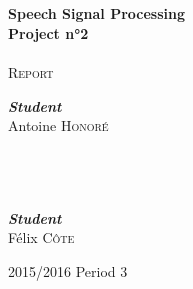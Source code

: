 \begin{titlepage}
  \begin{sffamily}
    \begin{center}

      \textsc{ }\\[1.5cm]

      \HRule \\[0.4cm]
      { \Huge \bfseries Speech Signal Processing\\ Project n°2\\[0.4cm] }
      \HRule \\[2.5cm]
      \textsc{\LARGE Report}~\\[2.5cm]
      \begin{minipage}{0.4\textwidth}
        \begin{flushleft} \large
          \emph{\textbf{Student}}\\
          Antoine \textsc{Honoré}\\
          ~\\~\\~\\
        \end{flushleft}
      \end{minipage}
      \hfill
      \begin{minipage}{0.4\textwidth}
        \begin{flushright} \large
          \emph{\textbf{Student}}\\
          Félix \textsc{Côte}\\
        \end{flushright}
      \end{minipage}

     

      \vfill

      {\large 2015/2016 Period 3}

    \end{center}
  \end{sffamily}

\end{titlepage}


